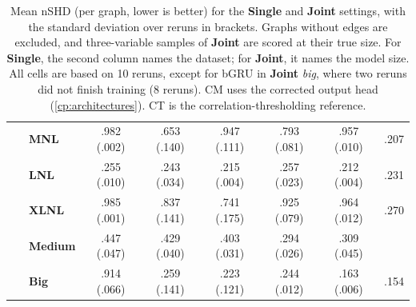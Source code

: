 \begin{table}[ht]
\begin{tabular}{l|lccccc|c}
        \rowcolor[HTML]{fff8e6}~ & \textbf{MNL} & .982 (.002) & .653 (.140) & .947 (.111) & .793 (.081) & .957 (.010) & .207 \\
        \rowcolor[HTML]{fff8e6}~ & \textbf{LNL} & .255 (.010) & .243 (.034) & .215 (.004) & .257 (.023) & .212 (.004) & .231 \\
        \rowcolor[HTML]{fff8e6}\multirow{-6}{*}{\rotatebox[origin=c]{90}{\textbf{Single}}} & \textbf{XLNL} & .985 (.001) & .837 (.141) & .741 (.175) & .925 (.079) & .964 (.012) & .270 \\
        \midrule\midrule
        \rowcolor[HTML]{fff8e6}~ & \textbf{Medium} & .447 (.047) & .429 (.040) & .403 (.031) & .294 (.026) & .309 (.045) & \\
        \rowcolor[HTML]{fff8e6}\multirow{-2}{*}{\rotatebox[origin=c]{90}{\textbf{Joint}}} & \textbf{Big} & .914 (.066) & .259 (.141) & .223 (.121) & .244 (.012) & .163 (.006) & \multirow{-2}{*}{.154} \\
    \bottomrule
    \end{tabular}
    \caption{Mean nSHD (per graph, lower is better) for the \textbf{Single} and \textbf{Joint} settings, with the standard deviation over reruns in brackets. Graphs without edges are excluded, and three-variable samples of \textbf{Joint} are scored at their true size. For \textbf{Single}, the second column names the dataset; for \textbf{Joint}, it names the model size. All cells are based on 10 reruns, except for bGRU in \textbf{Joint} \emph{big}, where two reruns did not finish training (8 reruns). CM uses the corrected output head (\cref{cp:architectures}). CT is the correlation-thresholding reference.}
\label{tab:cp:synthetic-nshd}
\end{table}
